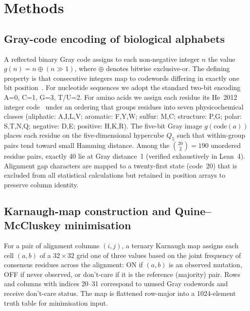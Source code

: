 \section{Methods}
\label{sec:methods}

\subsection{Gray-code encoding of biological alphabets}

A reflected binary Gray code assigns to each non-negative integer $n$ the
value $g(n) = n \oplus (n \gg 1)$, where $\oplus$ denotes bitwise exclusive-or.
The defining property is that consecutive integers map to codewords differing
in exactly one bit position~\cite{gray1953}.  For nucleotide sequences we adopt
the standard two-bit encoding A=0, C=1, G=3, T/U=2.  For amino acids we assign
each residue its He~2012 integer code~\cite{he2012} under an ordering that
groups residues into seven physicochemical classes (aliphatic: A,I,L,V;
aromatic: F,Y,W; sulfur: M,C; structure: P,G; polar: S,T,N,Q; negative: D,E;
positive: H,K,R).  The five-bit Gray image $g(\mathrm{code}(a))$ places each
residue on the five-dimensional hypercube $Q_5$ such that within-group pairs
tend toward small Hamming distance.  Among the $\binom{20}{2} = 190$ unordered
residue pairs, exactly 40 lie at Gray distance~1 (verified exhaustively in
Lean~4).  Alignment gap characters are mapped to a twenty-first state
(code~20) that is excluded from all statistical calculations but retained in
position arrays to preserve column identity.

\subsection{Karnaugh-map construction and Quine--McCluskey minimisation}

For a pair of alignment columns $(i,j)$, a ternary Karnaugh map assigns each
cell $(a,b)$ of a $32\times32$ grid one of three values based on the joint
frequency of consensus residues across the alignment: ON if $(a,b)$ is an
observed mutation, OFF if never observed, or don't-care if it is the reference
(majority) pair.  Rows and columns with indices 20--31 correspond to unused
Gray codewords and receive don't-care status.  The map is flattened row-major
into a 1024-element truth table for minimisation input.

